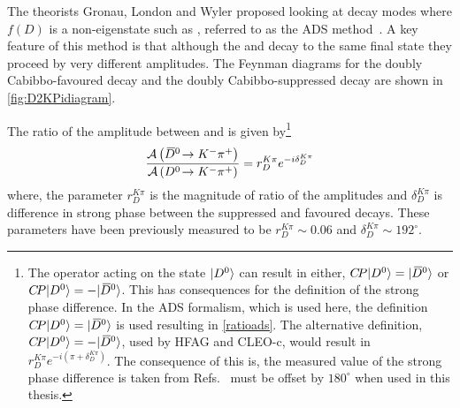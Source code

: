 The theorists Gronau, London and Wyler proposed looking at \D decay modes where $f(D)$ is a non-\CP eigenstate such as \decay{\D}{\Km\pip}, referred to as the ADS method~\cite{ADS,ADS-2001}. A key feature of this method is that although the \Dz and \Dzb decay to the same final state they proceed by very different amplitudes. The Feynman diagrams for the doubly Cabibbo-favoured \decay{\Dz}{\Km\pip} decay and the doubly Cabibbo-suppressed \decay{\Dz}{\Kp\pim} decay are shown in \fig\ref{fig:D2KPidiagram}.


The ratio of the amplitude between \decay{\Dzb}{\Km\pip} and \decay{\Dz}{\Km\pip} is given by\footnote{The \CP operator acting on the state $|{{D}^0}\rangle$ can result in either, ${C\!P}|{{D}^0}\rangle = |{{\kern 0.2em\overline{\kern -0.2em D}{}}{}^0}\rangle$ or ${C\!P}|{{D}^0}\rangle = - |{{\kern 0.2em\overline{\kern -0.2em D}{}}{}^0}\rangle$. This has consequences for the definition of the strong phase difference. In the ADS formalism, which is used here, the definition ${C\!P}|{{D}^0}\rangle = |{{\kern 0.2em\overline{\kern -0.2em D}{}}{}^0}\rangle$ is used resulting in \ref{ratioads}. The alternative definition, ${C\!P}|{{D}^0}\rangle = - |{{\kern 0.2em\overline{\kern -0.2em D}{}}{}^0}\rangle$, used by HFAG and CLEO-c, would result in $r_D^{K\pi}e^{-i(\pi + \delta_D^{K\pi})}$. The consequence of this is, the measured value of the strong phase difference is taken from Refs.~\cite{charmk3pi,LHCb-PAPER-2015-057} must be offset by $180^{\circ}$ when used in this thesis.}
\begin{equation}
\frac{\mathcal{A}\left({{\kern 0.2em\overline{\kern -0.2em D}{}}{}^0}\!\rightarrow {\ensuremath{{K}^-}}{\ensuremath{{\pi}^+}}\right)}{\mathcal{A}\left({{D}^0}\!\rightarrow {\ensuremath{{K}^-}}{\ensuremath{{\pi}^+}}\right)} = r_D^{K\pi}e^{-i\delta_D^{K\pi}}
\label{ratioads}
\end{equation}
where, the parameter $r_D^{K\pi}$ is the magnitude of ratio of the amplitudes and $\delta_D^{K\pi}$ is difference in strong phase between the suppressed and favoured decays. These parameters have been previously measured to be $r_D^{K\pi} \sim 0.06$ and $\delta_D^{K\pi} \sim 192^{\circ}$.

